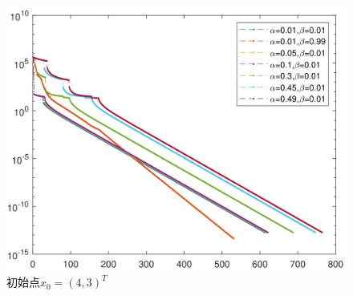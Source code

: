 \documentclass{article}
\begin{document}
\begin{figure}[H]
{\begin{minipage}[t]{0.48\textwidth}
            \includegraphics[scale=0.5]{Fig/group2_43.png}
        \end{minipage}
    }
    \caption{初始点$x_0=(4,3)^T$}
\end{figure}
\end{document}
